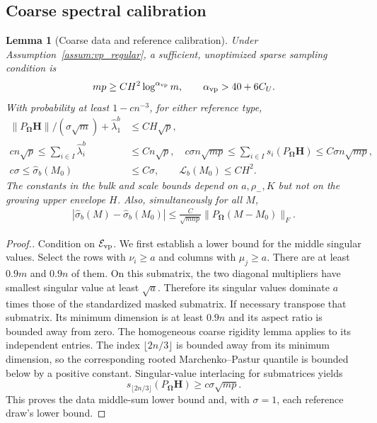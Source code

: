 \documentclass[numsec,webpdf,modern,large,namedate]{oup-authoring-template}
\theoremstyle{plain}
\newtheorem{slemma}{Lemma}%
\theoremstyle{remark}
\newcommand{\bH}{\bm{H}}
\newcommand{\bOmega}{\bm{\Omega}}
\newif\ifmarkchanges
\newenvironment{revision}{\begingroup\ifmarkchanges\color{red}\fi}{\endgroup}
\begin{document}
\begin{revision}
\subsection{Coarse spectral calibration}
\begin{slemma}[Coarse data and reference calibration]
\label{lem:vp_distribution_coarse}
Under Assumption~\ref{assum:vp_regular}, a sufficient, unoptimized sparse
sampling condition is
\begin{align}
 mp\ge C H^2\log^{\alpha_{\rm vp}}m,
 \qquad \alpha_{\rm vp}>40+6C_U.
 \label{eq:vp_sparse_sampling}
\end{align}
With probability at least $1-cn^{-3}$, for either reference type,
\begin{align}
 \|P_{\bOmega}\bH\|/(\sigma\sqrt m)+\widehat\lambda_1^b
 &\le CH\sqrt p,\label{eq:vp_dist_coarse_edge}\\
 cn\sqrt p\le\sum_{i\in I}\widehat\lambda_i^b&\le Cn\sqrt p,
 \quad
 c\sigma n\sqrt{mp}\le\sum_{i\in I}s_i(P_{\bOmega}\bH)
       \le C\sigma n\sqrt{mp},\label{eq:vp_dist_coarse_bulk}\\
 c\sigma\le\widehat\sigma_b(M_0)&\le C\sigma,
 \qquad \mathcal L_b(M_0)\le CH^2.
 \label{eq:vp_dist_coarse_scale_loss}
\end{align}
The constants in the bulk and scale bounds depend on $a,\rho_-,K$ but
not on the growing upper envelope $H$.  Also, simultaneously for all $M$,
\begin{align}
 |\widehat\sigma_b(M)-\widehat\sigma_b(M_0)|
 \le\frac{C}{\sqrt{mnp}}\|P_{\bOmega}(M-M_0)\|_F.
 \label{eq:vp_working_scale_uniform}
\end{align}
\end{slemma}
\begin{proof}[Proof.]
Condition on $\mathcal E_{\rm vp}$.  We first establish a lower bound for the middle singular values.  Select the rows with $\nu_i\ge a$ and columns with $\mu_j\ge a$.
There are at least $0.9m$ and $0.9n$ of them.  On this submatrix, the two
diagonal multipliers have smallest singular value at least $\sqrt a$.
Therefore its singular values dominate $a$ times those of the standardized
masked submatrix.  If necessary transpose that submatrix.  Its minimum
dimension is at least $0.9n$ and its aspect ratio is bounded away from zero.
The homogeneous coarse rigidity lemma applies to its independent entries.
The index $\lfloor2n/3\rfloor$ is bounded away from its minimum dimension,
so the corresponding rooted Marchenko--Pastur quantile is bounded below
by a positive constant.  Singular-value interlacing for submatrices yields
\[
 s_{\lfloor2n/3\rfloor}(P_{\bOmega}\bH)
       \ge c\sigma\sqrt{mp}.
\]
This proves the data middle-sum lower bound and, with $\sigma=1$, each
reference draw's lower bound.


\end{proof}
\end{revision}
\end{document}
